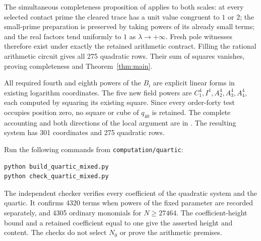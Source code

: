 \documentclass[11pt,a4paper]{article}
\theoremstyle{remark}\newtheorem{remark}[theorem]{Remark}
\begin{document}
The simultaneous completeness proposition of \cite{Packing} applies
to both scales: at every selected contact prime the cleared trace
has a unit value congruent to $1$ or $2$; the small-prime preparation
is preserved by taking powers of its already small terms; and the
real factors tend uniformly to $1$ as $\lambda\to+\infty$.
Fresh pole witnesses therefore exist under exactly the retained
arithmetic contract. Filling the rational arithmetic circuit gives
all 275 quadratic rows. Their sum of squares vanishes, proving
completeness and Theorem~\ref{thm:main}.

All required fourth and eighth powers of the $B_i$ are explicit
linear forms in existing logarithm coordinates. The five new field
powers are $C_1^4,I^4,A_2^4,A_3^4,A_4^4$, each computed by squaring
its existing square. Since every order-forty test occupies position
zero, no square or cube of $q_{40}$ is retained. The complete accounting
and both directions of the local argument are in \cite{Packing}.
The resulting system has 301 coordinates and 275 quadratic rows.

Run the following commands from \nolinkurl{computation/quartic}:
\begin{verbatim}
python build_quartic_mixed.py
python check_quartic_mixed.py
\end{verbatim}
The independent checker verifies every coefficient of the quadratic
system and the quartic. It confirms 4320 terms when powers of the
fixed parameter are recorded separately, and 4305 ordinary monomials
for $N\ge27464$. The coefficient-height bound and a retained
coefficient equal to one give the asserted height and content.
The checks do not select $N_0$ or prove the arithmetic premises.
\end{document}

